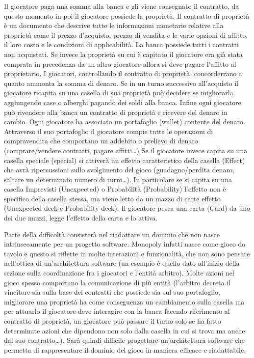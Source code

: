 Il giocatore paga una somma alla banca e gli viene consegnato il contratto, da questo momento in poi il giocatore possiede la proprietà.
Il contratto di proprietà è un documento che descrive tutte le informazioni monetarie relative alla proprietà come il prezzo d'acquisto,
prezzo di vendita e le varie opzioni di affitto, il loro costo e le condizioni di applicabilità.
La banca possiede tutti i contratti non acquistati.\newline
Se invece la proprietà su cui è capitato il giocatore era già stata comprata in precedenza da un altro giocatore allora si 
deve pagare l'affitto al proprietario. I giocatori, controllando il contratto di proprietà, concorderrano a quanto ammonta la somma di denaro.
Se in un turno successivo all'acquisto il giocatore ricapita su una casella di sua proprietà può decidere se migliorarla aggiungendo case 
o alberghi pagando dei soldi alla banca.
Infine ogni giocatore può rivendere alla banca un contratto di proprietà e ricevere del denaro in cambio.
Ogni giocatore ha associato un portafoglio (wallet) contente del denaro. Attraverso il suo portafoglio
il giocatore compie tutte le operazioni di compravendita che comportano un addebito o prelievo di denaro (comprare/vendere contratti, pagare affitti\dots)\newline
Se il giocatore invece capita su una casella speciale (special) si attiverà un effetto caratteristico della casella (Effect)
che avrà ripercussioni sullo svolgimento del gioco 
(guadagno/perdita denaro, saltare un determinato numero di turni\dots). 
In particolare se si capita su una casella Imprevisti (Unexpected) o Probabilità (Probability) l'effetto non 
è specifico della casella stessa, ma viene letto da un mazzo di carte effetto (Unexpected deck e Probability deck). 
Il giocatore pesca una carta (Card) da uno dei due mazzi, legge l'effetto della carta e lo attiva. \newline

Parte della difficoltà consisterà nel riadattare un dominio che non nasce intrinsecamente per un progetto software.
Monopoly infatti nasce come gioco da tavolo e questo si riflette in molte interazioni e funzionalità, che non sono pensate 
nell'ottica di un'architettura software (un esempio è quello dato all'inizio della sezione sulla coordinazione fra i giocatori e 
l'entità arbitro). Molte azioni nel gioco spesso comportano la comunicazione di più entità (l'arbitro decreta il vincitore sia sulla base dei 
contratti che possiede sia sul suo portafoglio, migliorare una
proprietà ha come conseguenza un cambiamento sulla casella ma per attuarlo il giocatore deve interagire con la banca facendo riferimento
al contratto di proprietà, un giocatore può passare il turno solo se ha fatto determinate azioni che dipendono non solo dalla casella in cui
si trova ma anche dal suo contratto\dots). 
Sarà quindi difficile progettare un'architettura software che permetta di rappresentare il dominio del gioco
in maniera efficace e riadattabile. 


